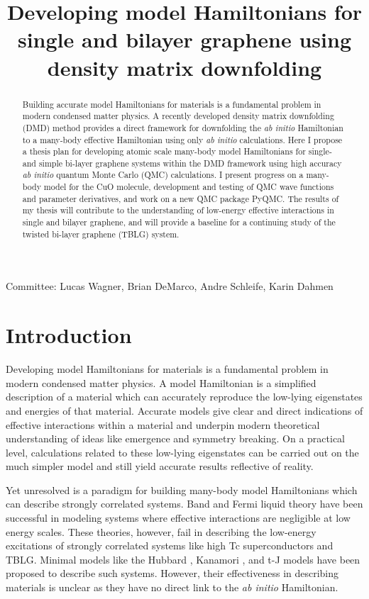 \documentclass[12pt]{article}
\date{\displaydate{date}}
\title{Developing model Hamiltonians for single and bilayer graphene using density matrix downfolding}
\begin{document}
\maketitle
\begin{abstract}
\thispagestyle{empty}
Building accurate model Hamiltonians for materials is a fundamental problem in modern condensed matter physics.
A recently developed density matrix downfolding (DMD) \cite{Zheng2017} method provides a direct framework for downfolding the \textit{ab initio} Hamiltonian to a many-body effective Hamiltonian using only \textit{ab initio} calculations. 
Here I propose a thesis plan for developing atomic scale many-body model Hamiltonians for single- and simple bi-layer graphene systems within the DMD framework using high accuracy \textit{ab initio} quantum Monte Carlo (QMC) calculations.
I present progress on a many-body model for the CuO molecule, development and testing of QMC wave functions and parameter derivatives, and work on a new QMC package PyQMC.
The results of my thesis will contribute to the understanding of low-energy effective interactions in single and bilayer graphene, and will provide a baseline for a continuing study of the twisted bi-layer graphene (TBLG) system.

\end{abstract}
Committee: Lucas Wagner, Brian DeMarco, Andre Schleife, Karin Dahmen
\clearpage
\pagebreak
\setcounter{page}{1}
\section{Introduction}
Developing model Hamiltonians for materials is a fundamental problem in modern condensed matter physics.
A model Hamiltonian is a simplified description of a material which can accurately reproduce the low-lying eigenstates and energies of that material.
Accurate models give clear and direct indications of effective interactions within a material and underpin modern theoretical understanding of ideas like emergence and symmetry breaking.
On a practical level, calculations related to these low-lying eigenstates can be carried out on the much simpler model and still yield accurate results reflective of reality.

Yet unresolved is a paradigm for building many-body model Hamiltonians which can describe strongly correlated systems.
Band and Fermi liquid theory have been successful in modeling systems where effective interactions are negligible at low energy scales.
These theories, however, fail in describing the low-energy excitations of strongly correlated systems like high Tc superconductors and TBLG.
Minimal models like the Hubbard \cite{Hubbard1963}, Kanamori \cite{10.1143/PTP.30.275},  and t-J \cite{Chao_1977} models have been proposed to describe such systems.
However, their effectiveness in describing materials is unclear as they have no direct link to the \textit{ab initio} Hamiltonian.
\end{document}
